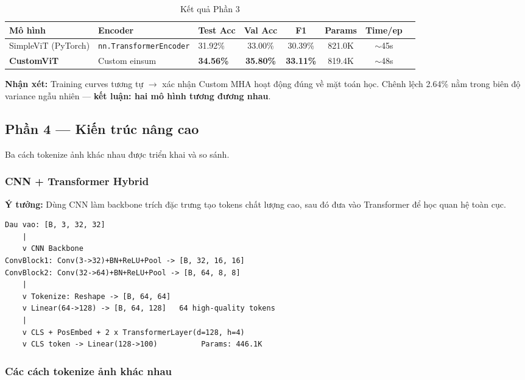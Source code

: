 \documentclass[12pt, a4paper]{article}
\begin{document}
\begin{table}[H]
\centering
\caption{Kết quả Phần 3}
\begin{tabular}{lllccccc}
\toprule
\textbf{Mô hình} & \textbf{Encoder} & \textbf{Test Acc} & \textbf{Val Acc} & \textbf{F1} & \textbf{Params} & \textbf{Time/ep} \\
\midrule
SimpleViT (PyTorch) & \texttt{nn.TransformerEncoder} & 31.92\% & 33.00\% & 30.39\% & 821.0K & $\sim$45s \\
\textbf{CustomViT}  & Custom einsum & \textbf{34.56\%} & \textbf{35.80\%} & \textbf{33.11\%} & 819.4K & $\sim$48s \\
\bottomrule
\end{tabular}
\end{table}

\textbf{Nhận xét:} Training curves tương tự $\rightarrow$ xác nhận Custom MHA hoạt động đúng về mặt toán học. Chênh lệch 2.64\% nằm trong biên độ variance ngẫu nhiên --- \textbf{kết luận: hai mô hình tương đương nhau}.

\subsection{Phần 4 --- Kiến trúc nâng cao}

Ba cách tokenize ảnh khác nhau được triển khai và so sánh.

\subsubsection{CNN + Transformer Hybrid}

\textbf{Ý tưởng:} Dùng CNN làm backbone trích đặc trưng tạo tokens chất lượng cao, sau đó đưa vào Transformer để học quan hệ toàn cục.

\begin{lstlisting}[style=plainstyle]
Dau vao: [B, 3, 32, 32]
    |
    v CNN Backbone
ConvBlock1: Conv(3->32)+BN+ReLU+Pool -> [B, 32, 16, 16]
ConvBlock2: Conv(32->64)+BN+ReLU+Pool -> [B, 64, 8, 8]
    |
    v Tokenize: Reshape -> [B, 64, 64]
    v Linear(64->128) -> [B, 64, 128]   64 high-quality tokens
    |
    v CLS + PosEmbed + 2 x TransformerLayer(d=128, h=4)
    v CLS token -> Linear(128->100)          Params: 446.1K
\end{lstlisting}

\subsubsection{Các cách tokenize ảnh khác nhau}
\end{document}
